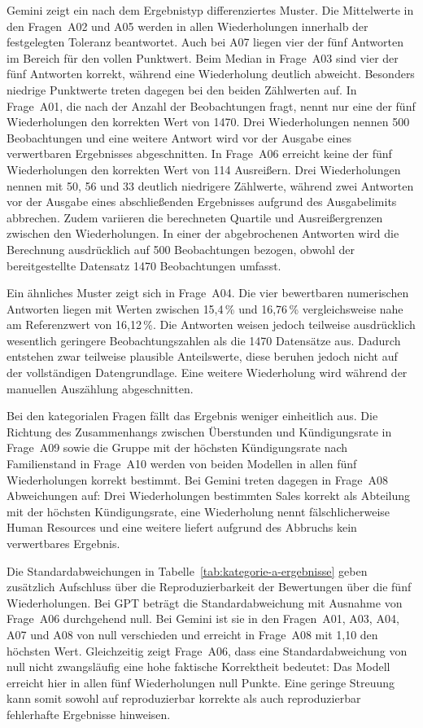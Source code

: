 Gemini zeigt ein nach dem Ergebnistyp differenziertes Muster. Die Mittelwerte in den Fragen~A02 und A05 werden in allen Wiederholungen innerhalb der festgelegten Toleranz beantwortet. Auch bei A07 liegen vier der fünf Antworten im Bereich für den vollen Punktwert. Beim Median in Frage~A03 sind vier der fünf Antworten korrekt, während eine Wiederholung deutlich abweicht. Besonders niedrige Punktwerte treten dagegen bei den beiden Zählwerten auf. In Frage~A01, die nach der Anzahl der Beobachtungen fragt, nennt nur eine der fünf Wiederholungen den korrekten Wert von 1470. Drei Wiederholungen nennen 500 Beobachtungen und eine weitere Antwort wird vor der Ausgabe eines verwertbaren Ergebnisses abgeschnitten. In Frage~A06 erreicht keine der fünf Wiederholungen den korrekten Wert von 114 Ausreißern. Drei Wiederholungen nennen mit 50, 56 und 33 deutlich niedrigere Zählwerte, während zwei Antworten vor der Ausgabe eines abschließenden Ergebnisses aufgrund des Ausgabelimits abbrechen. Zudem variieren die berechneten Quartile und Ausreißergrenzen zwischen den Wiederholungen. In einer der abgebrochenen Antworten wird die Berechnung ausdrücklich auf 500 Beobachtungen bezogen, obwohl der bereitgestellte Datensatz 1470 Beobachtungen umfasst.

Ein ähnliches Muster zeigt sich in Frage~A04. Die vier bewertbaren numerischen Antworten liegen mit Werten zwischen 15,4\,\% und 16,76\,\% vergleichsweise nahe am Referenzwert von 16,12\,\%. Die Antworten weisen jedoch teilweise ausdrücklich wesentlich geringere Beobachtungszahlen als die 1470 Datensätze aus. Dadurch entstehen zwar teilweise plausible Anteilswerte, diese beruhen jedoch nicht auf der vollständigen Datengrundlage. Eine weitere Wiederholung wird während der manuellen Auszählung abgeschnitten.

Bei den kategorialen Fragen fällt das Ergebnis weniger einheitlich aus. Die Richtung des Zusammenhangs zwischen Überstunden und Kündigungsrate in Frage~A09 sowie die Gruppe mit der höchsten Kündigungsrate nach Familienstand in Frage~A10 werden von beiden Modellen in allen fünf Wiederholungen korrekt bestimmt. Bei Gemini treten dagegen in Frage~A08 Abweichungen auf: Drei Wiederholungen bestimmten Sales korrekt als Abteilung mit der höchsten Kündigungsrate, eine Wiederholung nennt fälschlicherweise Human Resources und eine weitere liefert aufgrund des Abbruchs kein verwertbares Ergebnis.

Die Standardabweichungen in Tabelle~\ref{tab:kategorie-a-ergebnisse} geben zusätzlich Aufschluss über die Reproduzierbarkeit der Bewertungen über die fünf Wiederholungen. Bei GPT beträgt die Standardabweichung mit Ausnahme von Frage~A06 durchgehend null. Bei Gemini ist sie in den Fragen~A01, A03, A04, A07 und A08 von null verschieden und erreicht in Frage~A08 mit 1,10 den höchsten Wert. Gleichzeitig zeigt Frage~A06, dass eine Standardabweichung von null nicht zwangsläufig eine hohe faktische Korrektheit bedeutet: Das Modell erreicht hier in allen fünf Wiederholungen null Punkte. Eine geringe Streuung kann somit sowohl auf reproduzierbar korrekte als auch reproduzierbar fehlerhafte Ergebnisse hinweisen.

